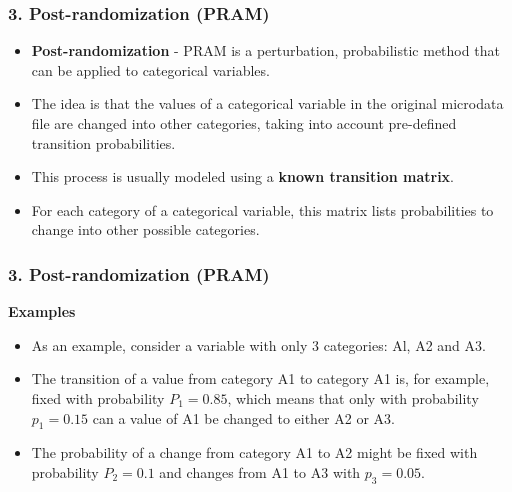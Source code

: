 \documentclass{beamer}
\begin{document}
\begin{frame}
	\frametitle{3. Post-randomization (PRAM)}
\begin{itemize}

\item \textbf{Post-randomization} - PRAM is a perturbation, probabilistic method that can be applied to categorical variables. 

\item The idea is that the values of a categorical variable in the original microdata file are changed into other categories, taking into account pre-deﬁned transition probabilities.
\item This process is
usually modeled using a \textbf{known transition matrix}. 

\item For each category of a categorical variable, this matrix lists probabilities to change into other possible categories.
\end{itemize}
\end{frame}
\begin{frame}
	\frametitle{3. Post-randomization (PRAM)}
\textbf{Examples}\\
	\begin{itemize}


\item 

As an example, consider a variable with only 3 categories: Al, A2 and A3. 
\item The
transition of a value from category A1 to category A1 is, for example, ﬁxed with
probability $P_1 = 0.85$, which means that only with probability $p_1 = 0.15$ can a
value of A1 be changed to either A2 or A3. 
\item The probability of a change from category A1 to A2 might be ﬁxed with probability $P_2 = 0.1$ and changes from A1
to A3 with $p_3 = 0.05$. 

\end{itemize}
\end{frame}
\end{document}
